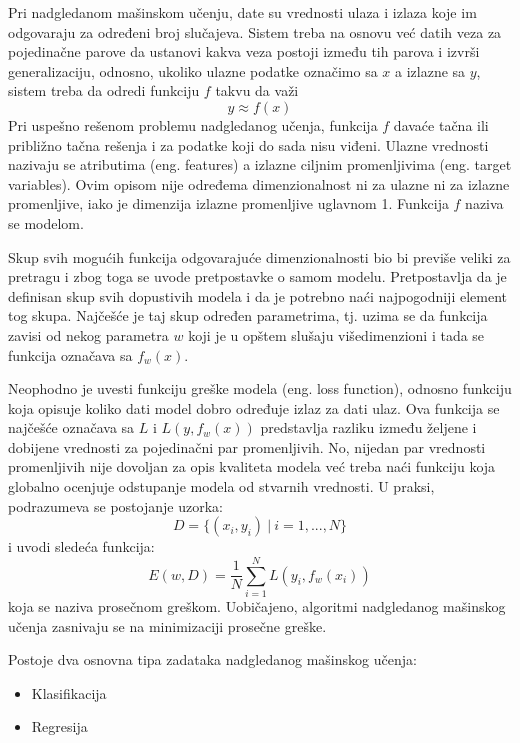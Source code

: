 Pri nadgledanom mašinskom učenju, date su vrednosti ulaza i izlaza koje im odgovaraju za određeni broj slučajeva. Sistem treba na osnovu već datih veza za pojedinačne parove da ustanovi kakva veza postoji između tih parova i izvrši generalizaciju, odnosno, ukoliko ulazne podatke označimo sa $x$ a izlazne sa $y$, sistem treba da odredi funkciju $f$ takvu da važi
\begin{equation}
	y \approx f(x)
\end{equation}
Pri uspešno rešenom problemu nadgledanog učenja, funkcija $f$ davaće tačna ili približno tačna rešenja i za podatke koji do sada nisu viđeni.
Ulazne vrednosti nazivaju se atributima (eng. features) a izlazne ciljnim promenljivima (eng. target variables). Ovim opisom nije određema dimenzionalnost ni za ulazne ni za izlazne promenljive, iako je dimenzija izlazne promenljive uglavnom 1. Funkcija $f$ naziva se modelom. \par
Skup svih mogućih funkcija odgovarajuće dimenzionalnosti bio bi previše veliki za pretragu i zbog toga se uvode pretpostavke o samom modelu. Pretpostavlja da je definisan skup svih dopustivih modela i da je potrebno naći najpogodniji element tog skupa. Najčešće je taj skup određen parametrima, tj. uzima se da funkcija zavisi od nekog parametra $w$ koji je u opštem slušaju višedimenzioni i tada se funkcija označava sa $f_w(x)$.

\par
Neophodno je uvesti funkciju greške modela (eng. loss function), odnosno funkciju koja opisuje koliko dati model dobro određuje izlaz za dati ulaz. Ova funkcija se najčešće označava sa $L$ i $L(y, f_w(x))$ predstavlja razliku između željene i dobijene vrednosti za pojedinačni par promenljivih. No, nijedan par vrednosti promenljivih nije dovoljan za opis kvaliteta modela već treba naći funkciju koja globalno ocenjuje odstupanje modela od stvarnih vrednosti. U praksi, podrazumeva se postojanje uzorka:
\begin{equation}
		D=\{(x_i, y_i)~|~i=1,...,N\}
\end{equation}
i uvodi sledeća funkcija:
\begin{equation}
	E(w, D) = \frac{1}{N}\sum_{i=1}^{N}L(y_i, f_w(x_i))
\end{equation}
koja se naziva prosečnom greškom. Uobičajeno, algoritmi nadgledanog mašinskog učenja zasnivaju se na minimizaciji prosečne greške. \par 
Postoje dva osnovna tipa zadataka nadgledanog mašinskog učenja:
\begin{itemize}
	\item Klasifikacija 
	\item Regresija
\end{itemize}

